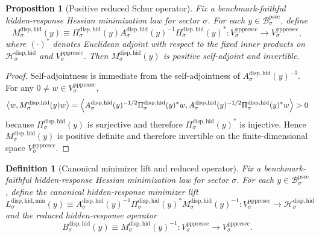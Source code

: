 \documentclass[11pt]{article}
\newcommand{\ProtoSectionBody}[1]{\mathcal B_{#1}^{\mathrm{psec}}}
\newcommand{\PrePreProtoSectionVertical}[1]{V_{#1}^{\mathrm{pppresec}}}
\newcommand{\HiddenCarrier}[1]{\mathcal H_{#1}^{\mathrm{disp,hid}}}
\newcommand{\HiddenReadout}[1]{\Pi_{#1}^{\mathrm{disp,hid}}}
\newcommand{\HiddenHessian}[1]{A_{#1}^{\mathrm{disp,hid}}}
\newcommand{\ReducedSchur}[1]{M_{#1}^{\mathrm{disp,hid}}}
\newcommand{\ReducedCoreOperator}[1]{B_{#1}^{\mathrm{disp,hid}}}
\newcommand{\HiddenMinLift}[1]{L_{#1}^{\mathrm{disp,hid,min}}}
\newtheorem{definition}{Definition}
\newtheorem{proposition}{Proposition}
\begin{document}
\begin{proposition}[Positive reduced Schur operator]
\label{prop:schur}
Fix a benchmark-faithful hidden-response Hessian minimization law for sector \(\sigma\). For each \(y\in\ProtoSectionBody{\sigma}\), define
\begin{equation}
\ReducedSchur{\sigma}(y)
\equiv
\HiddenReadout{\sigma}(y)
\HiddenHessian{\sigma}(y)^{-1}
\HiddenReadout{\sigma}(y)^*
:
\PrePreProtoSectionVertical{\sigma}\to\PrePreProtoSectionVertical{\sigma},
\label{eq:schur}
\end{equation}
where \((\cdot)^*\) denotes Euclidean adjoint with respect to the fixed inner products on \(\HiddenCarrier{\sigma}\) and \(\PrePreProtoSectionVertical{\sigma}\). Then \(\ReducedSchur{\sigma}(y)\) is positive self-adjoint and invertible.
\end{proposition}

\begin{proof}
Self-adjointness is immediate from the self-adjointness of \(\HiddenHessian{\sigma}(y)^{-1}\). For any \(0\neq w\in\PrePreProtoSectionVertical{\sigma}\),
\[
\ev{w,\ReducedSchur{\sigma}(y)w}
=
\ev{
\HiddenHessian{\sigma}(y)^{-1/2}\HiddenReadout{\sigma}(y)^*w,
\HiddenHessian{\sigma}(y)^{-1/2}\HiddenReadout{\sigma}(y)^*w
}
>0
\]
because \(\HiddenReadout{\sigma}(y)\) is surjective and therefore \(\HiddenReadout{\sigma}(y)^*\) is injective. Hence \(\ReducedSchur{\sigma}(y)\) is positive definite and therefore invertible on the finite-dimensional space \(\PrePreProtoSectionVertical{\sigma}\).
\end{proof}

\begin{definition}[Canonical minimizer lift and reduced operator]
\label{def:lift}
Fix a benchmark-faithful hidden-response Hessian minimization law for sector \(\sigma\). For each \(y\in\ProtoSectionBody{\sigma}\), define the \emph{canonical hidden-response minimizer lift}
\begin{equation}
\HiddenMinLift{\sigma}(y)
\equiv
\HiddenHessian{\sigma}(y)^{-1}
\HiddenReadout{\sigma}(y)^*
\ReducedSchur{\sigma}(y)^{-1}
:
\PrePreProtoSectionVertical{\sigma}\to\HiddenCarrier{\sigma}
\label{eq:lift}
\end{equation}
and the \emph{reduced hidden-response operator}
\begin{equation}
\ReducedCoreOperator{\sigma}(y)
\equiv
\ReducedSchur{\sigma}(y)^{-1}
:
\PrePreProtoSectionVertical{\sigma}\to\PrePreProtoSectionVertical{\sigma}.
\label{eq:reduced}
\end{equation}
\end{definition}
\end{document}
